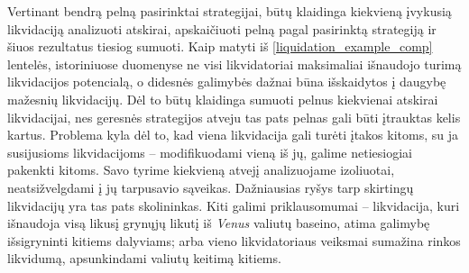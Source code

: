 \documentclass[]{VUMIFTemplateClass}
\begin{document}
Vertinant bendrą pelną pasirinktai strategijai, būtų klaidinga kiekvieną įvykusią likvidaciją analizuoti atskirai, apskaičiuoti pelną pagal pasirinktą strategiją ir šiuos rezultatus tiesiog sumuoti. Kaip matyti iš \ref{liquidation_example_comp} lentelės, istoriniuose duomenyse ne visi likvidatoriai maksimaliai išnaudojo turimą likvidacijos potencialą, o didesnės galimybės dažnai būna išskaidytos į daugybę mažesnių likvidacijų. Dėl to būtų klaidinga sumuoti pelnus kiekvienai atskirai likvidacijai, nes geresnės strategijos atveju tas pats pelnas gali būti įtrauktas kelis kartus. Problema kyla dėl to, kad viena likvidacija gali turėti įtakos kitoms, su ja susijusioms likvidacijoms – modifikuodami vieną iš jų, galime netiesiogiai pakenkti kitoms. Savo tyrime kiekvieną atvejį analizuojame izoliuotai, neatsižvelgdami į jų tarpusavio sąveikas. Dažniausias ryšys tarp skirtingų likvidacijų yra tas pats skolininkas. Kiti galimi priklausomumai – likvidacija, kuri išnaudoja visą likusį grynųjų likutį iš \textit{Venus} valiutų baseino, atima galimybę išsigryninti kitiems dalyviams; arba vieno likvidatoriaus veiksmai sumažina rinkos likvidumą, apsunkindami valiutų keitimą kitiems.

\end{document}
